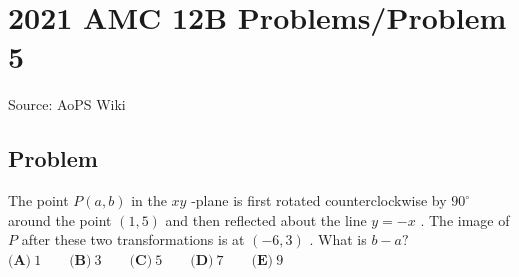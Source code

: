 \documentclass[12pt]{article}
\begin{document}
\section*{{2021 AMC 12B Problems/Problem 5}}
Source: AoPS Wiki

\subsection*{Problem}
The point $P(a,b)$ in the $xy$ -plane is first rotated counterclockwise by $90^\circ$ around the point $(1,5)$ and then reflected about the line $y = -x$ . The image of $P$ after these two transformations is at $(-6,3)$ . What is $b - a ?$ $\textbf{(A)} ~1 \qquad\textbf{(B)} ~3 \qquad\textbf{(C)} ~5 \qquad\textbf{(D)} ~7 \qquad\textbf{(E)} ~9$
\end{document}
